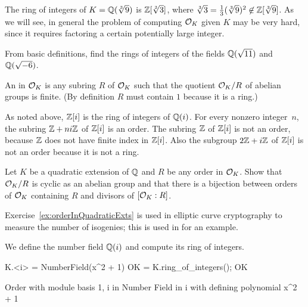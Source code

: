\begin{example}
	The ring of integers of $K=\mathbb{Q}(\sqrt[3]{9})$ is $\mathbb{Z}[\sqrt[3]{3}]$,
	where $\sqrt[3]{3}=\frac{1}{3}(\sqrt[3]{9})^2 \not \in \mathbb{Z}[\sqrt[3]{9}]$.
	As we will see, in general the problem of computing $\mathcal{O}_K$ given $K$
	may be very hard, since it requires factoring a certain potentially
	large integer.
\end{example}

\begin{exercise}
	From basic definitions, find the rings of integers of the fields
	$\mathbb{Q}(\sqrt{11})$ and $\mathbb{Q}(\sqrt{-6})$.
\end{exercise}

\begin{definition}[Order]\label{defn:order}
	An  in $\mathcal{O}_K$ is any subring $R$ of $\mathcal{O}_K$ such that
	the quotient $\mathcal{O}_K/R$ of abelian groups is finite.
	(By definition $R$ must contain $1$ because it is a ring.)
\end{definition}
As noted above, $\mathbb{Z}[i]$ is the ring of integers of $\mathbb{Q}(i)$.  For every
nonzero integer~$n$, the subring $\mathbb{Z}+ni\mathbb{Z}$ of $\mathbb{Z}[i]$ is an order.
The subring $\mathbb{Z}$ of $\mathbb{Z}[i]$ is not an order, because $\mathbb{Z}$ does not
have finite index in $\mathbb{Z}[i]$.  Also the subgroup $2\mathbb{Z} + i\mathbb{Z}$ of
$\mathbb{Z}[i]$ is not an order because it is not a ring.

\begin{exercise}\label{ex:orderInQuadraticExts}
	Let $K$ be a quadratic extension of $\mathbb{Q}$
	and $R$ be any order in $\mathcal{O}_K$.
	Show that $\mathcal{O}_K/R$ is cyclic as an abelian group
	and that there is a bijection between orders of
	$\mathcal{O}_K$ containing $R$ and divisors of $[\mathcal{O}_K:R]$.
\end{exercise}

\begin{remark}
	Exercise~\ref{ex:orderInQuadraticExts} is used in
	elliptic curve cryptography to measure the number
	of isogenies; this is used in \cite[\S11.2]{Koblitz2011781}
	for an example.
\end{remark}

We define the number field $\mathbb{Q}(i)$ and compute its
ring of integers.
\begin{sagecode}
\begin{sagecell}
K.<i> = NumberField(x^2 + 1)
OK = K.ring_of_integers(); OK
\end{sagecell}
\begin{sageout}
Order with module basis 1, i in Number Field in i with
defining polynomial x^2 + 1
\end{sageout}
\end{sagecode}

